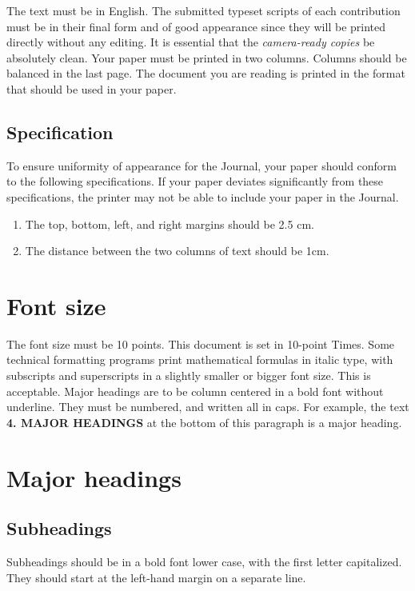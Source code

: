 \documentclass{jcst}
\begin{document}
The text must be in English. The submitted typeset scripts of each contribution must be in their final form and of good appearance since they will be printed directly without any editing. It is essential that the \textit{camera-ready copies} be absolutely clean.
Your paper must be printed in two columns. Columns should be balanced in the last page. The document you are reading is printed in the format that should be used in your paper.

\subsection{Specification}

To ensure uniformity of appearance for the Journal, your paper should conform to
 the following specifications. If your paper deviates significantly from these
 specifications, the printer may not be able to include your paper in the Journal.

\begin{enumerate}
\item The top, bottom, left, and right margins should be 2.5 cm.
\item The distance between the two columns of text should be 1cm.
\end{enumerate}

\section{Font size}
The font size must be 10 points. This document is set in 10-point Times. Some technical
formatting programs print mathematical formulas in italic type, with subscripts
and superscripts in a slightly smaller or bigger font size. This is acceptable.
Major headings are to be column centered in a bold font without underline.
They must be numbered, and written all in caps. For example, the text
 \textbf{4. MAJOR HEADINGS} at the bottom of this paragraph is a major heading.

\section{Major headings}

\subsection{Subheadings}
Subheadings should be in a bold font lower case, with the first letter capitalized.
They should start at the left-hand margin on a separate line.
\end{document}
